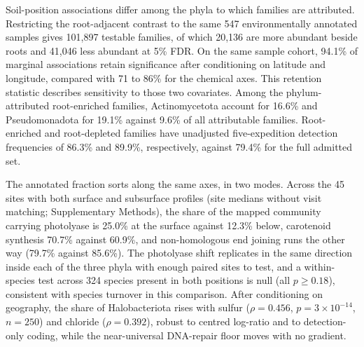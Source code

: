 Soil-position associations differ among the phyla to which families are attributed. Restricting
the root-adjacent contrast to the same 547 environmentally annotated samples gives 101{,}897 testable
families, of which 20{,}136 are more abundant beside roots and 41{,}046 less abundant at 5\% FDR.
On the same sample cohort, 94.1\% of marginal associations retain significance after conditioning
on latitude and longitude, compared with 71 to 86\% for the chemical axes. This retention statistic
describes sensitivity to those two covariates. Among the phylum-attributed root-enriched families,
Actinomycetota account for 16.6\% and Pseudomonadota for 19.1\% against 9.6\% of all attributable
families. Root-enriched and root-depleted families have unadjusted
five-expedition detection frequencies of 86.3\% and 89.9\%, respectively, against 79.4\% for the
full admitted set.

The annotated fraction sorts along the same axes, in two modes. Across the 45 sites with both surface and subsurface profiles (site medians without visit matching; Supplementary Methods), the share of the mapped community
carrying photolyase is 25.0\% at the surface against 12.3\% below, carotenoid synthesis 70.7\%
against 60.9\%, and non-homologous end joining runs the other way (79.7\% against 85.6\%). The photolyase shift replicates in the same direction inside each of
the three phyla with enough paired sites to test, and a within-species test across 324 species
present in both positions is null (all $p \geq 0.18$), consistent with species turnover in this comparison. After conditioning on geography,
the share of Halobacteriota rises with sulfur ($\rho = 0.456$, $p = 3 \times 10^{-14}$, $n = 250$)
and chloride ($\rho = 0.392$), robust to centred log-ratio and to detection-only coding, while the
near-universal DNA-repair floor moves with no gradient.

